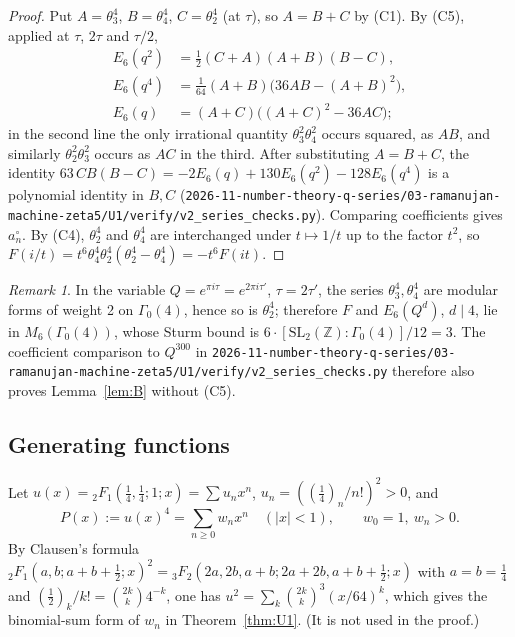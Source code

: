 \documentclass[11pt]{amsart}
\theoremstyle{definition}
\theoremstyle{remark}
\newtheorem{remark}[theorem]{Remark}
\numberwithin{equation}{section}
\newcommand{\Z}{\mathbb{Z}}
\newcommand{\file}[1]{\nolinkurl{2026-11-number-theory-q-series/03-ramanujan-machine-zeta5/#1}}
\begin{document}
\begin{proof}
Put $A=\theta_3^4$, $B=\theta_4^4$, $C=\theta_2^4$ (at $\tau$), so $A=B+C$ by (C1). By (C5), applied at $\tau$, $2\tau$ and $\tau/2$,
\begin{align*}
E_6(q^2)&=\tfrac12(C+A)(A+B)(B-C),\\
E_6(q^4)&=\tfrac1{64}(A+B)\bigl(36AB-(A+B)^2\bigr),\\
E_6(q)&=(A+C)\bigl((A+C)^2-36AC\bigr);
\end{align*}
in the second line the only irrational quantity $\theta_3^2\theta_4^2$ occurs squared, as $AB$, and similarly $\theta_2^2\theta_3^2$ occurs as $AC$ in the third. After substituting $A=B+C$, the identity $63\,CB(B-C)=-2E_6(q)+130E_6(q^2)-128E_6(q^4)$ is a polynomial identity in $B,C$ (\file{U1/verify/v2_series_checks.py}). Comparing coefficients gives $a^\circ_n$. By (C4), $\theta_2^4$ and $\theta_4^4$ are interchanged under $t\mapsto1/t$ up to the factor $t^2$, so $F(i/t)=t^6\theta_4^4\theta_2^4(\theta_2^4-\theta_4^4)=-t^6F(it)$.
\end{proof}

\begin{remark}\label{rem:sturm}
In the variable $Q=e^{\pi i\tau}=e^{2\pi i\tau'}$, $\tau=2\tau'$, the series $\theta_3^4,\theta_4^4$ are modular forms of weight 2 on $\Gamma_0(4)$, hence so is $\theta_2^4$; therefore $F$ and $E_6(Q^d)$, $d\mid4$, lie in $M_6(\Gamma_0(4))$, whose Sturm bound is $6\cdot[\mathrm{SL}_2(\Z):\Gamma_0(4)]/12=3$. The coefficient comparison to $Q^{300}$ in \file{U1/verify/v2_series_checks.py} therefore also proves Lemma~\ref{lem:B} without (C5).
\end{remark}

\subsection{Generating functions}
Let $u(x)={}_2F_1(\frac14,\frac14;1;x)=\sum u_nx^n$, $u_n=((\frac14)_n/n!)^2>0$, and
\[
P(x):=u(x)^4=\sum_{n\ge0}w_nx^n\quad(|x|<1),\qquad w_0=1,\ w_n>0.
\]
By Clausen's formula ${}_2F_1(a,b;a+b+\frac12;x)^2={}_3F_2(2a,2b,a+b;2a+2b,a+b+\frac12;x)$ \cite[16.12.2]{DLMF} with $a=b=\frac14$ and $(\frac12)_k/k!=\binom{2k}k4^{-k}$, one has $u^2=\sum_k\binom{2k}k^3(x/64)^k$, which gives the binomial-sum form of $w_n$ in Theorem~\ref{thm:U1}. (It is not used in the proof.)
\end{document}
